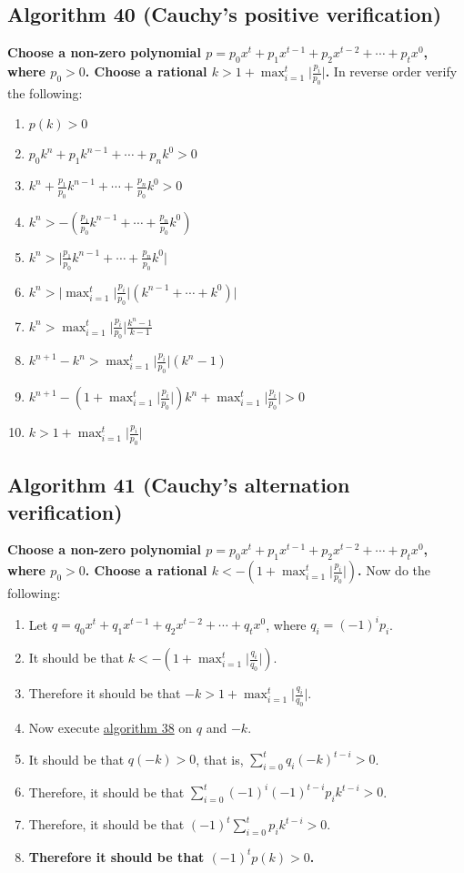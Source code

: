 \documentclass[twocolumn]{article}
\begin{document}
		\subsection{Algorithm 40 (Cauchy's positive verification)}\label{sec:algorithm 40}
			\textbf{Choose a non-zero polynomial $p=p_0x^t+p_1x^{t-1}+p_2x^{t-2}+\cdots+p_tx^0$, where $p_0>0$. Choose a rational $k>1+\max_{i=1}^t\lvert\frac{p_i}{p_0}\rvert$.} In reverse order verify the following:
			\begin{enumerate}
				\item \textbf{$p(k)>0$}
				\item $p_0k^n+p_1k^{n-1}+\cdots+p_nk^0>0$
				\item $k^n+\frac{p_1}{p_0}k^{n-1}+\cdots+\frac{p_n}{p_0}k^0>0$
				\item $k^n>-(\frac{p_1}{p_0}k^{n-1}+\cdots+\frac{p_n}{p_0}k^0)$
				\item $k^n>\lvert \frac{p_1}{p_0}k^{n-1}+\cdots+\frac{p_n}{p_0}k^0\rvert$
				\item $k^n>\lvert\max_{i=1}^t\lvert \frac{p_i}{p_0}\rvert(k^{n-1}+\cdots+k^0)\rvert$
				\item $k^n>\max_{i=1}^t\lvert \frac{p_i}{p_0}\rvert\frac{k^n-1}{k-1}$
				\item $k^{n+1}-k^n>\max_{i=1}^t\lvert \frac{p_i}{p_0}\rvert(k^n-1)$
				\item $k^{n+1}-(1+\max_{i=1}^t\lvert \frac{p_i}{p_0}\rvert)k^n+\max_{i=1}^t\lvert \frac{p_i}{p_0}\rvert>0$
				\item $k>1+\max_{i=1}^t\lvert \frac{p_i}{p_0}\rvert$
			\end{enumerate}
		\subsection{Algorithm 41 (Cauchy's alternation verification)}\label{sec:algorithm 41}
			\textbf{Choose a non-zero polynomial $p=p_0x^t+p_1x^{t-1}+p_2x^{t-2}+\cdots+p_tx^0$, where $p_0>0$. Choose a rational $k<-(1+\max_{i=1}^t\lvert\frac{p_i}{p_0}\rvert)$.} Now do the following:
			\begin{enumerate}
				\item Let $q=q_0x^t+q_1x^{t-1}+q_2x^{t-2}+\cdots+q_tx^0$, where $q_i=(-1)^ip_i$.
				\item It should be that $k<-(1+\max_{i=1}^t\lvert\frac{q_i}{q_0}\rvert)$.
				\item Therefore it should be that $-k>1+\max_{i=1}^t\lvert\frac{q_i}{q_0}\rvert$.
				\item Now execute \hyperref[sec:algorithm 38]{algorithm 38} on $q$ and $-k$.
				\item It should be that $q(-k)>0$, that is, $\sum_{i=0}^t q_i(-k)^{t-i}>0$.
				\item Therefore, it should be that $\sum_{i=0}^t (-1)^i(-1)^{t-i}p_ik^{t-i}>0$.
				\item Therefore, it should be that $(-1)^t\sum_{i=0}^t p_ik^{t-i}>0$.
				\item \textbf{Therefore it should be that $(-1)^tp(k)>0$.}
			\end{enumerate}
\end{document}

